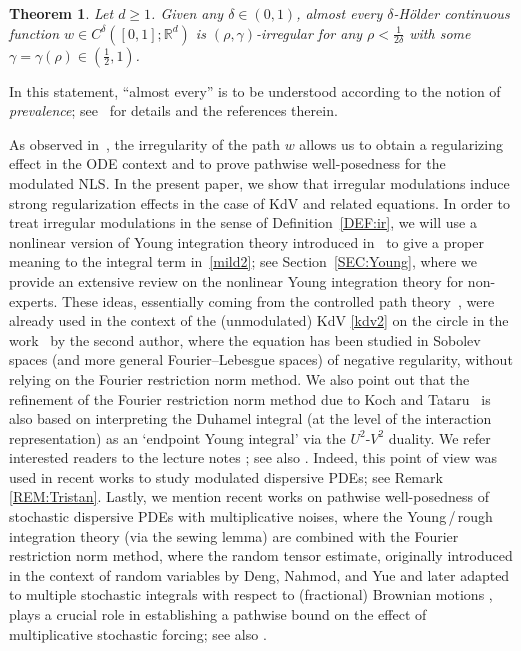 \documentclass[letterpaper, 11pt,  reqno]{amsart}
\newtheorem{oldtheorem}{Theorem}
\newcommand{\1}{\hspace{0.5mm}\text{I}\hspace{0.5mm}}
\newcommand{\R}{\mathbb{R}}
\newcommand{\dl}{\delta}
\newcommand{\g}{\gamma}
\numberwithin{equation}{section}
\numberwithin{theorem}{section}
\begin{document}
\begin{oldtheorem}
\label{THM:B}
Let  $d \ge 1$.
Given  any $\delta \in (0,1)$, almost every $\dl$-H\"older continuous  function $w \in C^\delta([0,1];\R^d)$ 
 is $(\rho,\g)$-irregular for any $\rho < \frac1{2\delta}$ with  some $\gamma = \gamma(\rho) \in (\frac 12,1)$.
\end{oldtheorem}


In this statement, ``almost every'' is to be understood according to the notion of {\it prevalence}; see~\cite{GG} for details and the  references therein.


As observed in~\cite{CatellierGubinelli,CG1}, the irregularity of the path $w$ allows 
us to obtain a regularizing effect in the ODE context and 
to prove pathwise well-posedness for 
the modulated  NLS.
In the present paper, we show that irregular modulations 
induce strong regularization effects 
in the case of  KdV
and related  equations.
In order to treat 
 irregular modulations in the sense of Definition~\ref{DEF:ir},
we will use a nonlinear version of Young integration theory introduced in~\cite{CG1}
to give a proper meaning to the integral term in~\eqref{mild2};
see Section~\ref{SEC:Young}, 
where we provide an extensive review on the nonlinear Young integration theory
for non-experts.
These ideas, essentially coming from the controlled  path theory~\cite{Gub04}, were already used in the context of the (unmodulated)  KdV \eqref{kdv2} on the circle  in the work~\cite{GubinelliKdV} 
by the second author, 
where the equation has been studied in Sobolev spaces (and more general Fourier--Lebesgue spaces) 
of negative regularity, 
without relying on the Fourier restriction norm method.
We also point out that the refinement of the Fourier restriction norm method
due to Koch and Tataru~\cite{KT}
is also based on interpreting the Duhamel integral (at the level of the interaction representation)
as an `endpoint Young integral' via the $U^2$-$V^2$ duality.
We refer interested readers to the lecture notes \cite{Koch};
see also \cite{HHK}.
Indeed, this point of view was used in 
recent works
\cite{Robert2, Robert3}
to study modulated dispersive PDEs;
see Remark \ref{REM:Tristan}.
Lastly, we  mention recent works \cite{CLO2, CLO3, COZ,  CLOO}
on 
pathwise well-posedness of stochastic dispersive PDEs
with multiplicative noises, 
where 
the Young\,/\,rough integration theory
(via the sewing lemma)
are combined with
the Fourier restriction norm method, 
where the random tensor estimate, 
originally introduced in the context 
of random variables by Deng, Nahmod, and Yue \cite{DNY3}
and later adapted  
to multiple stochastic integrals with respect to (fractional) Brownian motions \cite{OWZ, CLO2}, 
plays a crucial role in establishing a pathwise bound
on the effect of multiplicative stochastic forcing; 
see also \cite{CGLLO2, SLO}. 
\end{document}
